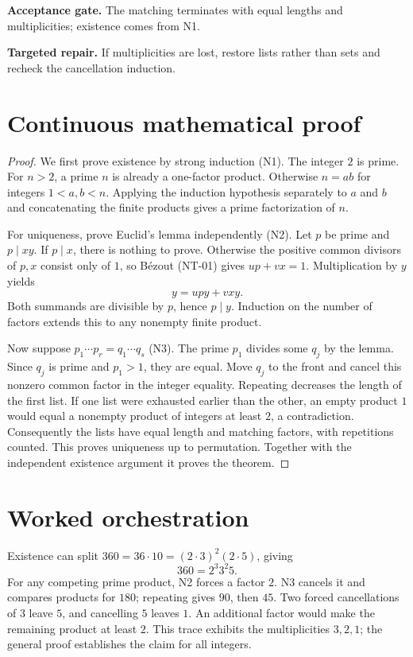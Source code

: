\documentclass[preprint,12pt,aps,pra,showkeys,amsmath,amssymb,superscriptaddress,floatfix]{revtex4-2}
\theoremstyle{definition}
\theoremstyle{remark}
\newcommand{\field}[2]{\par\smallskip\noindent\textbf{#1.} #2\par}
\begin{document}
\field{Acceptance gate}{The matching terminates with equal lengths and multiplicities; existence
comes from N1.}

\field{Targeted repair}{If multiplicities are lost, restore lists rather than sets and recheck
the cancellation induction.}

\clearpage\section{Continuous mathematical proof}\label{sec:proof}

\begin{proof}

We first prove existence by strong induction (N1). The integer \(2\) is
prime. For \(n>2\), a prime \(n\) is already a one-factor product.
Otherwise \(n=ab\) for integers \(1<a,b<n\). Applying the induction
hypothesis separately to \(a\) and \(b\) and concatenating the finite
products gives a prime factorization of \(n\).

For uniqueness, prove Euclid's lemma independently (N2). Let \(p\) be
prime and \(p\mid xy\). If \(p\mid x\), there is nothing to prove.
Otherwise the positive common divisors of \(p,x\) consist only of \(1\),
so Bézout (NT-01) gives \(up+vx=1\). Multiplication by \(y\) yields
\[y=upy+vxy.\] Both summands are divisible by \(p\), hence \(p\mid y\).
Induction on the number of factors extends this to any nonempty finite
product.

Now suppose \(p_1\cdots p_r=q_1\cdots q_s\) (N3). The prime \(p_1\)
divides some \(q_j\) by the lemma. Since \(q_j\) is prime and \(p_1>1\),
they are equal. Move \(q_j\) to the front and cancel this nonzero common
factor in the integer equality. Repeating decreases the length of the
first list. If one list were exhausted earlier than the other, an empty
product \(1\) would equal a nonempty product of integers at least \(2\),
a contradiction. Consequently the lists have equal length and matching
factors, with repetitions counted. This proves uniqueness up to
permutation. Together with the independent existence argument it proves
the theorem.

\end{proof}

\section{Worked orchestration}

Existence can split \(360=36\cdot10=(2\cdot3)^2(2\cdot5)\), giving
\[360=2^3 3^2 5.\] For any competing prime product, N2 forces a factor
\(2\). N3 cancels it and compares products for \(180\); repeating gives
\(90\), then \(45\). Two forced cancellations of \(3\) leave \(5\), and
cancelling \(5\) leaves \(1\). An additional factor would make the
remaining product at least \(2\). This trace exhibits the multiplicities
\(3,2,1\); the general proof establishes the claim for all integers.
\end{document}
